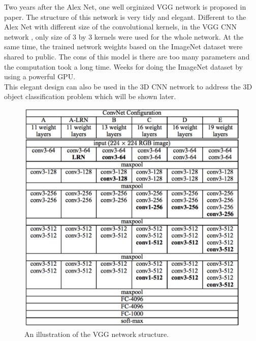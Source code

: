 \documentclass[a4paper,12pt]{article}
\begin{document}
Two years after the Alex Net, one well orginized VGG network is proposed in paper\cite{NIPS2012_4824}. The structure of this network is very tidy and elegant. Different to the Alex Net\cite{NIPS2012_4824} with different size of the convolutional kernels, in the VGG CNN network\cite{SimonyanZ14a} , only size of 3 by 3 kernels were used for the whole network. At the same time, the trained network weights based on the ImageNet\cite{imagenet_cvpr09} dataset were shared to public. The cons of this model is there are too many parameters and the computation took a long time. Weeks for doing the ImageNet\cite{imagenet_cvpr09}  dataset by using a powerful GPU. \\
This elegant design can also be used in the 3D CNN network to address the 3D object classification problem which will be shown later.\\
 \begin{figure}[H]
  \begin{center}
      \includegraphics[scale=0.75]{vgg16.png}
\end{center}
\caption{An illustration of the VGG network structure.}
 \label{fig:vgg16}
 \end{figure}
\end{document}
